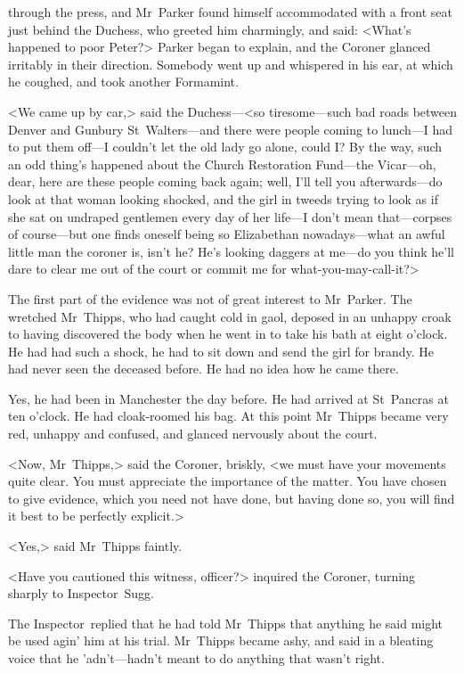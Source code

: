 through the press, and Mr~Parker found himself accommodated with a front seat just behind the Duchess, who greeted him charmingly, and said: <What's happened to poor Peter?> Parker began to explain, and the Coroner glanced irritably in their direction. Somebody went up and whispered in his ear, at which he coughed, and took another Formamint.

<We came up by car,> said the Duchess—<so tiresome—such bad roads between Denver and Gunbury St~Walters—and there were people coming to lunch—I had to put them off—I couldn't let the old lady go alone, could I\@? By the way, such an odd thing's happened about the Church Restoration Fund—the Vicar—oh, dear, here are these people coming back again; well, I'll tell you afterwards—do look at that woman looking shocked, and the girl in tweeds trying to look as if she sat on undraped gentlemen every day of her life—I don't mean that—corpses of course—but one finds oneself being so Elizabethan nowadays—what an awful little man the coroner is, isn't he? He's looking daggers at me—do you think he'll dare to clear me out of the court or commit me for what-you-may-call-it?>

The first part of the evidence was not of great interest to Mr~Parker. The wretched Mr~Thipps, who had caught cold in gaol, deposed in an unhappy croak to having discovered the body when he went in to take his bath at eight o'clock. He had had such a shock, he had to sit down and send the girl for brandy. He had never seen the deceased before. He had no idea how he came there.

Yes, he had been in Manchester the day before. He had arrived at St~Pancras at ten o'clock. He had cloak-roomed his bag. At this point Mr~Thipps became very red, unhappy and confused, and glanced nervously about the court.

<Now, Mr~Thipps,> said the Coroner, briskly, <we must have your movements quite clear. You must appreciate the importance of the matter. You have chosen to give evidence, which you need not have done, but having done so, you will find it best to be perfectly explicit.>

<Yes,> said Mr~Thipps faintly.

<Have you cautioned this witness, officer?> inquired the Coroner, turning sharply to Inspector~Sugg.

The Inspector~replied that he had told Mr~Thipps that anything he said might be used agin' him at his trial. Mr~Thipps became ashy, and said in a bleating voice that he 'adn't—hadn't meant to do anything that wasn't right.

